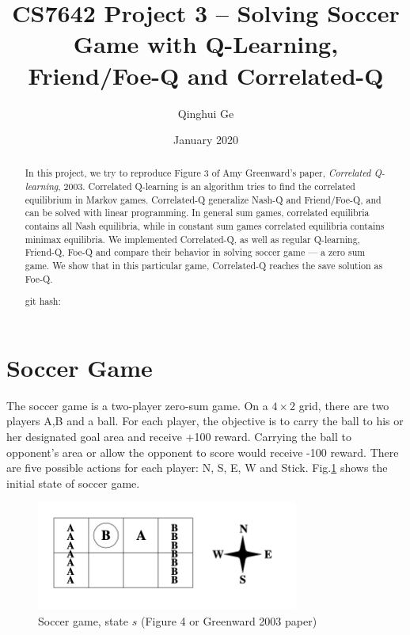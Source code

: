 \documentclass[conference]{IEEEtran}
\title{CS7642 Project 3 -- Solving Soccer Game with Q-Learning, Friend/Foe-Q and Correlated-Q}
\author{Qinghui Ge}
\date{January 2020}
\begin{document}
	
	\maketitle
	
\begin{abstract}
In this project, we try to reproduce Figure 3 of Amy Greenward's paper, \textit{Correlated Q-learning}, 2003\cite{greenwald2003correlated}.  Correlated Q-learning is an algorithm tries to find the correlated equilibrium in Markov games. Correlated-Q generalize Nash-Q and Friend/Foe-Q, and can be solved with linear programming. In general sum games, correlated equilibria contains all Nash equilibria, while in constant sum games correlated equilibria contains minimax equilibria. We implemented Correlated-Q, as well as regular Q-learning, Friend-Q, Foe-Q and compare their behavior in solving soccer game --- a zero sum game. We show that in this particular game, Correlated-Q reaches the save solution as Foe-Q.

	git hash: 
\end{abstract}
	
	
\section{Soccer Game}
The soccer game is a two-player zero-sum game. On a $4\times2$ grid, there are two players A,B and a ball. For each player, the objective is to carry the ball to his or her designated goal area and receive +100 reward. Carrying the ball to opponent's area or allow the opponent to score would receive -100 reward. There are five possible actions for each player: N, S, E, W and Stick. Fig.\ref{fig:state_s} shows the initial state of soccer game.

\begin{figure}
	\centering
	\includegraphics[width=3.4in]{figures/state_s}
	\caption{Soccer game, state $s$ (Figure 4 or Greenward 2003 paper\cite{greenwald2003correlated})}
	\label{fig:state_s}
\end{figure}
\end{document}
